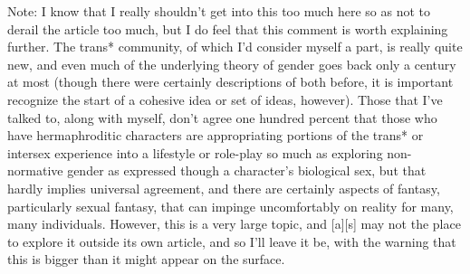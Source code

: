 \secdiv

Note: I know that I really shouldn't get into this too much here so as not to derail the article too much, but I do feel that this comment is worth explaining further. The trans* community, of which I'd consider myself a part, is really quite new, and even much of the underlying theory of gender goes back only a century at most (though there were certainly descriptions of both before, it is important recognize the start of a cohesive idea or set of ideas, however). Those that I've talked to, along with myself, don't agree one hundred percent that those who have hermaphroditic characters are appropriating portions of the trans* or intersex experience into a lifestyle or role-play so much as exploring non-normative gender as expressed though a character's biological sex, but that hardly implies universal agreement, and there are certainly aspects of fantasy, particularly sexual fantasy, that can impinge uncomfortably on reality for many, many individuals. However, this is a very large topic, and [a][s] may not the place to explore it outside its own article, and so I'll leave it be, with the warning that this is bigger than it might appear on the surface.
